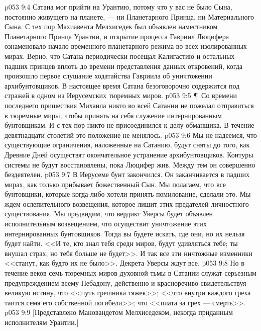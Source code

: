 \vs p053 9:4 Сатана мог прийти на Урантию, потому что у вас не было Сына, постоянно живущего на планете, --- ни Планетарного Принца, ни Материального Сына. С тех пор Махиавента Мелхиседек был объявлен наместником Планетарного Принца Урантии, и открытие процесса Гавриил  Люцифера ознаменовало начало временного планетарного режима во всех изолированных мирах. Верно, что Сатана периодически посещал Калигастию и остальных падших принцев вплоть до времени представления данных откровений, когда произошло первое слушание ходатайства Гавриила об уничтожении архибунтовщиков. В настоящее время Сатана безоговорочно содержится под стражей в одном из Иерусемских тюремных миров.
\vs p053 9:5 \P\ Со времени последнего пришествия Михаила никто во всей Сатании не пожелал отправиться в тюремные миры, чтобы принять на себя служение интернированным бунтовщикам. И с тех пор никто не присоединился к делу обманщика. В течение девятнадцати столетий это положение не менялось.
\vs p053 9:6 Мы не надеемся, что существующие ограничения, наложенные на Сатанию, будут сняты до того, как Древние Дней осуществят окончательное устранение архибунтовщиков. Контуры системы не будут восстановлены, пока Люцифер жив. Между тем он совершенно бездеятелен.
\vs p053 9:7 В Иерусеме бунт закончился. Он заканчивается в падших мирах, как только прибывает божественный Сын. Мы полагаем, что все бунтовщики, которые когда\hyp{}либо хотели принять помилование, сделали это. Мы ждем ослепительного возвещения, которое лишит этих предателей личностного существования. Мы предвидим, что вердикт Уверсы будет объявлен исполнительным возвещением, что осуществит уничтожение этих интернированных бунтовщиков. Тогда вы будете искать, где они, но их нельзя будет найти. <<И те, кто знал тебя среди миров, будут удивляться тебе; ты внушал страх, но тебя больше не будет>>. И так все эти ничтожные изменники <<станут, как будто их не было>>. Декрета Уверсы ждут все.
\vs p053 9:8 Но в течение веков семь тюремных миров духовной тьмы в Сатании служат серьезным предупреждением всему Небадону, действенно и красноречиво свидетельствуя великую истину, что <<путь грешника тяжек>>; <<что внутри каждого греха таится семя его собственной погибели>>; что <<плата за грех --- смерть>>.
\vs p053 9:9 [Представлено Мановандетом Мелхиседеком, некогда приданным исполнителям Урантии.]
